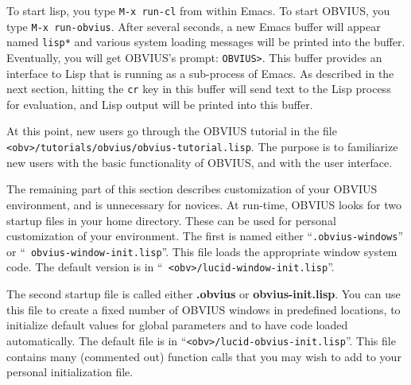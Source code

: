 To start lisp, you type {\tt M-x run-cl} from within Emacs.  To start
OBVIUS, you type {\tt M-x run-obvius}. After several seconds, a new
Emacs buffer will appear named {\tt *lisp*} and various system loading
messages will be printed into the buffer.  Eventually, you will get
OBVIUS's prompt: {\tt OBVIUS>}.  This buffer provides an interface to
Lisp that is running as a sub-process of Emacs.  As described in the
next section, hitting the {\tt cr} key in this buffer will send text
to the Lisp process for evaluation, and Lisp output will be printed
into this buffer.  

At this point, new users go through the OBVIUS tutorial in the file
{\tt <obv>/tutorials/obvius/obvius-tutorial.lisp}.  The purpose is to
familiarize new users with the basic functionality of OBVIUS, and with
the user interface.

The remaining part of this section describes customization of your
OBVIUS environment, and is unnecessary for novices.  At run-time,
OBVIUS looks for two startup files in your home directory.  These can
be used for personal customization of your environment.  The first is
named either ``{\tt .obvius-windows}'' or ``{\tt
obvius-window-init.lisp}''.  This file loads the appropriate window
system code.  The default version is in ``{\tt
<obv>/lucid-window-init.lisp}''.

The second startup file is called either {\bf .obvius} or {\bf
obvius-init.lisp}.  You can use this file to create a fixed number of
OBVIUS windows in predefined locations, to initialize default values
for global parameters and to have code loaded automatically.  The
default file is in ``{\tt <obv>/lucid-obvius-init.lisp}''.  This file
contains many (commented out) function calls that you may wish to add
to your personal initialization file.

